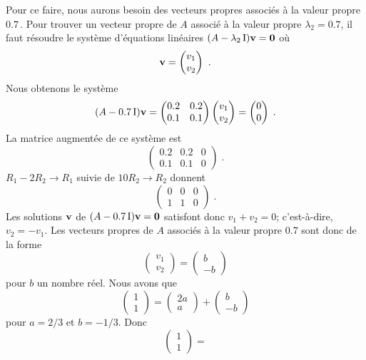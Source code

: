 {\begin{rmk}[\theory]
Pour ce faire, nous aurons besoin des vecteurs propres associés à la
valeur propre $0.7$\,.  Pour trouver un vecteur propre de $A$ associé
à la valeur propre $\lambda_2=0.7$, il faut résoudre le système
d'équations linéaires
$(A -\lambda_2 \operatorname{I}) \mathbf{v} = \mathbf{0}$ où
\[
  \mathbf{v} = \begin{pmatrix} v_1 \\ v_2 \end{pmatrix} \ .
\]
Nous obtenons le système
\[
(A -0.7 \operatorname{I}) \mathbf{v} =
\begin{pmatrix} 0.2 & 0.2 \\ 0.1 & 0.1 \end{pmatrix}
\begin{pmatrix} v_1 \\ v_2 \end{pmatrix} =
\begin{pmatrix} 0 \\ 0 \end{pmatrix} \; .
\]
La matrice augmentée de ce système est
\[
\left(\begin{array}{rr|r}
0.2 & 0.2 & 0 \\
0.1 & 0.1 & 0
\end{array}\right) \; .
\]
$R_1 - 2R_2 \to R_1$ suivie de $10 R_2 \to R_2$ donnent
\[
\left(\begin{array}{rr|r}
0 & 0 & 0 \\
1 & 1 & 0
\end{array}\right) \; .
\]
Les solutions $\mathbf{v}$ de $(A -0.7 \operatorname{I}) \mathbf{v} = \mathbf{0}$
satisfont donc $v_1 +v_2 = 0$; c'est-à-dire, $v_2= -v_1$.  Les
vecteurs propres de $A$ associés à la valeur propre $0.7$ sont donc de
la forme
\[
\begin{pmatrix} v_1 \\ v_2 \end{pmatrix} =
\begin{pmatrix} b \\ -b \end{pmatrix}
\]
pour $b$ un nombre réel.  Nous avons que
\[
\begin{pmatrix} 1 \\ 1 \end{pmatrix} =
\begin{pmatrix} 2a \\ a \end{pmatrix} + \begin{pmatrix} b \\ -b \end{pmatrix}
\]
pour $a=2/3$ et $b=-1/3$.  Donc
\[
\begin{pmatrix} 1 \\ 1 \end{pmatrix} =
\]
\end{rmk}}
